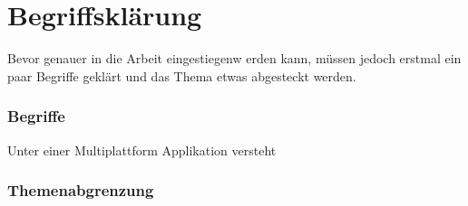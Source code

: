 \chapter{Begriffsklärung}

Bevor genauer in die Arbeit eingestiegenw erden kann, müssen jedoch erstmal ein paar Begriffe geklärt und das Thema etwas abgesteckt werden.

\subsection{Begriffe}
Unter einer Multiplattform Applikation versteht 

\subsection{Themenabgrenzung}
